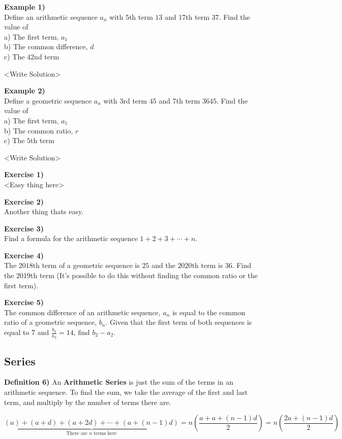 \documentclass[a4paper]{article}
\begin{document}
\textbf{Example 1)} \\
Define an arithmetic sequence $a_n$ with 5th term $13$ and 17th term $37$. Find the value of \\
a) The first term, $a_1$ \\
b) The common difference, $d$ \\
c) The $42$nd term

<Write Solution>

\textbf{Example 2)} \\
Define a geometric sequence $a_n$ with 3rd term $45$ and 7th term $3645$. Find the value of \\
a) The first term, $a_1$ \\
b) The common ratio, $r$ \\
c) The $5$th term

<Write Solution>

\textbf{Exercise 1)} \\
<Easy thing here>

\textbf{Exercise 2)} \\
Another thing thats easy.

\textbf{Exercise 3)} \\
Find a formula for the arithmetic sequence $1+2+3+\cdots+n$.

\textbf{Exercise 4)} \\
The $2018$th term of a geometric sequence is $25$ and the $2020$th term is $36$. Find the $2019$th term (It's possible to do this without finding the common ratio or the first term).

\textbf{Exercise 5)} \\
The common difference of an arithmetic sequence, $a_n$ is equal to the common ratio of a geometric sequence, $b_n$. Given that the first term of both sequences is equal to $7$ and $\frac{b_2}{a_2}=14$, find $b_2-a_2$.

\subsection{Series}

\textbf{Definition 6)}  An \textbf{Arithmetic Series} is just the sum of the terms in an arithmetic sequence. To find the sum, we take the average of the first and last term, and multiply by the number of terms there are.

$$\underbrace{(a)+(a+d)+(a+2d)+\cdots+(a+(n-1)d)}_{\text{There are }n \text{ terms here}}=n\left(\frac{a+a+(n-1)d}{2}\right)=\boxed{n\left(\frac{2a+(n-1)d}{2}\right)}$$
\end{document}
